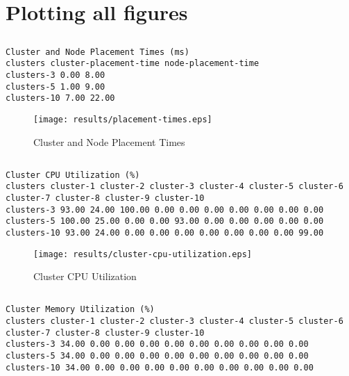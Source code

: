 \documentclass{elsart}
\begin{document}
\section{Plotting all figures}
\subsection{}

\begin{lstlisting}[caption={Cluster and Node Placement Times}]
Cluster and Node Placement Times (ms)
clusters cluster-placement-time node-placement-time
clusters-3 0.00 8.00
clusters-5 1.00 9.00
clusters-10 7.00 22.00
\end{lstlisting}

\begin{figure}[ht]
\centering
\texttt{[image: results/placement-times.eps]}
\caption{Cluster and Node Placement Times}\label{fig:placement-times.eps}
\end{figure}

\subsection{}

\begin{lstlisting}[caption={Cluster CPU Utilization}]
Cluster CPU Utilization (%)
clusters cluster-1 cluster-2 cluster-3 cluster-4 cluster-5 cluster-6 cluster-7 cluster-8 cluster-9 cluster-10
clusters-3 93.00 24.00 100.00 0.00 0.00 0.00 0.00 0.00 0.00 0.00
clusters-5 100.00 25.00 0.00 0.00 93.00 0.00 0.00 0.00 0.00 0.00
clusters-10 93.00 24.00 0.00 0.00 0.00 0.00 0.00 0.00 0.00 99.00
\end{lstlisting}

\begin{figure}[ht]
\centering
\texttt{[image: results/cluster-cpu-utilization.eps]}
\caption{Cluster CPU Utilization}\label{fig:cluster-cpu-utilization.eps}
\end{figure}

\subsection{}

\begin{lstlisting}[caption={Cluster Memory Utilization}]
Cluster Memory Utilization (%)
clusters cluster-1 cluster-2 cluster-3 cluster-4 cluster-5 cluster-6 cluster-7 cluster-8 cluster-9 cluster-10
clusters-3 34.00 0.00 0.00 0.00 0.00 0.00 0.00 0.00 0.00 0.00
clusters-5 34.00 0.00 0.00 0.00 0.00 0.00 0.00 0.00 0.00 0.00
clusters-10 34.00 0.00 0.00 0.00 0.00 0.00 0.00 0.00 0.00 0.00
\end{lstlisting}
\end{document}

